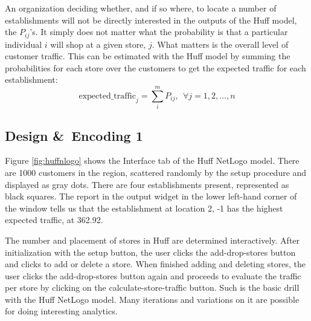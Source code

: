 An organization deciding whether, and if so where, to locate a number of establishments will not be directly interested in the outputs of the Huff model, the $P_{ij}$'s. It simply does not matter what the probability is that a particular individual $i$ will shop at a given store, $j$.  What matters is the overall level of customer traffic. This can be estimated with the Huff model by summing the probabilities for each store over the customers to get the expected traffic for each establishment:
\begin{equation}
 \mbox{expected\_traffic}_j = \sum_{i}^m P_{ij}, \ \ \forall j = 1, 2, \ldots, n
 \end{equation}

\newpage
\subsection{Design \&\ Encoding 1}

Figure \ref{fig:huffnlogo} shows the Interface tab of the  Huff NetLogo model. There are 1000 customers in the region, scattered randomly by the setup procedure and displayed as gray dots. There are four establishments present, represented as black squares. The report in the output widget in the lower left-hand corner of the window tells us that the establishment at location 2, -1 has the highest expected traffic, at 362.92. 

The number and placement of stores in Huff are determined interactively. After initialization with the setup button, the user clicks the add-drop-stores button and clicks to add or delete a store. When finished adding and deleting stores, the user clicks the add-drop-stores button again and proceeds to  evaluate the traffic per store by clicking on the calculate-store-traffic button.  Such is the basic drill with the Huff NetLogo model. Many  iterations and variations on it are possible for doing interesting analytics.


